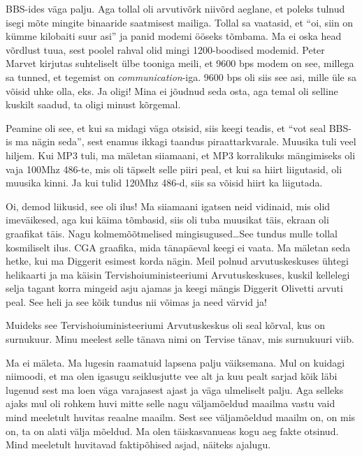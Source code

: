 BBS-ides väga palju. Aga tollal oli arvutivõrk niivõrd aeglane, et poleks 
tulnud isegi mõte mingite binaaride saatmisest mailiga. Tollal  sa vaatasid, et 
\enquote{oi, siin on kümme kilobaiti suur asi} ja  panid modemi ööseks tõmbama. 
Ma ei oska head võrdlust tuua, sest poolel rahval olid mingi 1200-boodised 
modemid. Peter Marvet kirjutas  suhteliselt ülbe 
tooniga meili, et  9600 bps modem on see, millega sa tunned, et tegemist on 
\emph{communication}-iga. 9600 bps oli siis see asi, mille üle sa võisid uhke 
olla, eks.  Ja oligi! Mina ei jõudnud seda osta, aga temal oli selline kuskilt 
saadud, ta oligi minust kõrgemal. 

Peamine oli see, et  kui sa midagi väga otsisid, siis keegi teadis, et 
\enquote{vot seal BBS-is ma nägin seda}, sest enamus ikkagi taandus 
piraattarkvarale. Muusika tuli veel hiljem. Kui MP3 tuli, ma mäletan siiamaani, 
et MP3 korralikuks mängimiseks oli vaja 100Mhz 486-te, mis oli täpselt selle 
piiri peal, et kui sa hiirt liigutasid,  oli muusika kinni. Ja kui tulid 120Mhz 
486-d, siis sa võisid hiirt ka liigutada.


Oi, demod liikusid, see oli ilus! Ma siiamaani igatsen neid vidinaid, mis olid 
imeväikesed, aga kui käima tõmbasid, siis oli tuba muusikat täis, ekraan oli  
graafikat täis. Nagu kolmemõõtmelised mingisugused\ldots See tundus mulle 
tollal kosmiliselt ilus. CGA graafika, mida 
tänapäeval keegi ei vaata. Ma mäletan seda hetke, kui ma Diggerit 
esimest korda nägin. Meil polnud arvutuskeskuses ühtegi helikaarti ja ma käisin 
Tervishoiuministeeriumi Arvutuskeskuses, kuskil  kellelegi selja tagant korra mingeid asju ajamas ja 
keegi mängis Diggerit Olivetti arvuti peal. See heli ja see kõik tundus nii 
võimas ja need värvid ja! 

Muideks see Tervishoiuministeeriumi Arvutuskeskus oli seal kõrval, kus on 
surnukuur. Minu meelest selle tänava nimi on Tervise tänav, mis surnukuuri 
viib. 


Ma ei mäleta. Ma lugesin raamatuid lapsena palju väiksemana. Mul on kuidagi 
niimoodi, et ma olen igasugu seiklusjutte vee alt ja kuu pealt sarjad kõik läbi 
lugenud sest ma loen väga varajasest ajast ja väga  ulmeliselt palju. Aga 
selleks ajaks mul oli rohkem huvi mitte selle nagu väljamõeldud maailma vastu 
vaid mind meeletult  huvitas reaalne maailm. Sest see väljamõeldud maailm on, 
on mis on, ta on alati välja mõeldud. Ma olen täiskasvanueas kogu aeg fakte 
otsinud. Mind meeletult huvitavad faktipõhised asjad, näiteks ajalugu. 


